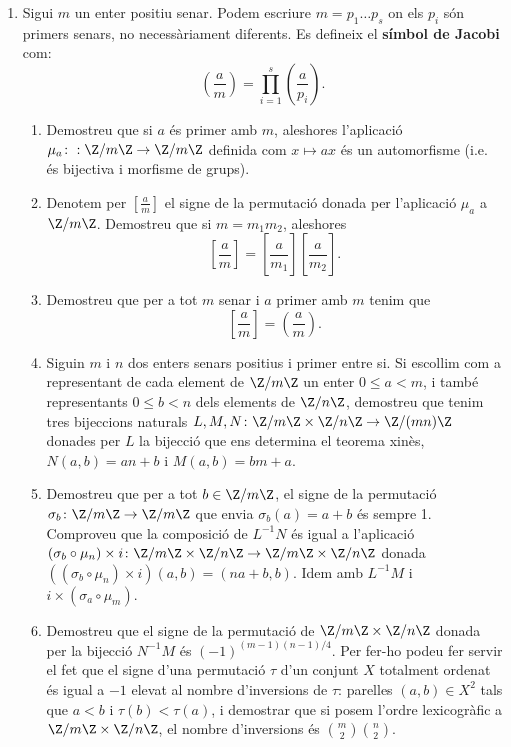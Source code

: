 \begin{enumerate}[leftmargin=*]
\item Sigui $m$ un enter positiu
senar. Podem escriure $m=p_1\dots p_s$ on els $p_i$ són primers
senars, no necessàriament diferents. Es defineix el \textbf{símbol de Jacobi}
com:
$$
\displaystyle{\left (\frac{a}{m} \right )=\prod_{i=1}^{s}\left
(\frac{a}{p_i} \right )}.
$$

\begin{enumerate}
\item Demostreu que si $a$ és primer amb $m$, aleshores
l'aplicació $\mu_a\colon : \Z/m\Z\to \Z/m\Z$ definida com $x\mapsto ax$ és un automorfisme
(i.e. és bijectiva i morfisme de grups).

\item Denotem per  $\displaystyle{\left[\frac{a}{m} \right]}$ el signe de la permutació donada per
l'aplicació $\mu_a$ a $\Z/m\Z$. Demostreu que si $m=m_1m_2$,
aleshores
$$
\displaystyle{\left[ \frac{a}{m} \right] =\left [\frac{a}{m_1}
\right]\left [\frac{a}{m_2} \right]}.
$$

\item Demostreu que per a tot $m$ senar i $a$ primer amb $m$
tenim que
$$\displaystyle{\left[\frac{a}{m} \right]}=\displaystyle{\left(\frac{a}{m}
\right)}.$$

\item Siguin $m$ i $n$ dos enters senars positius i primer
entre si. Si escollim com a representant de cada element de $\Z/m\Z$
un enter $0\le a <m$, i també representants $0\le b<n$ dels
elements de $\Z/n\Z$, demostreu que tenim tres bijeccions naturals
$L,M,N\colon \Z/m\Z\times \Z/n\Z\to \Z/(mn)\Z$ donades per $L$ la
bijecció que ens determina el teorema xin\`{e}s, $N(a,b)=an+b$ i
$M(a,b)=bm+a$.

\item Demostreu que per a tot $b\in \Z/m\Z$, el signe de la permutació
$\sigma_b\colon\Z/m\Z\to \Z/m\Z$ que envia $\sigma_b(a)=a+b$ és
sempre 1.  Comproveu que la composició de $L^{-1}N$ és igual
a l'aplicació $(\sigma_b\circ \mu_n)\times i \colon\Z/m\Z\times
\Z/n\Z\to \Z/m\Z\times \Z/n\Z$ donada $((\sigma_b\circ \mu_n)\times
i)(a,b)=(na+b,b)$. Idem amb $L^{-1}M$ i $i\times (\sigma_a\circ
\mu_m)$.

\item Demostreu que el signe de la permutació de $\Z/m\Z\times \Z/n\Z$ donada per la
bijecció $N^{-1}M$ és $(-1)^{(m-1)(n-1)/4}$. Per fer-ho podeu
fer servir el fet que el signe d'una permutació $\tau$ d'un conjunt $X$
totalment ordenat és igual a $-1$ elevat al nombre d'inversions de
$\tau$: parelles $(a,b)\in X^2$ tals que $a<b$ i $\tau(b)<\tau(a)$,
i demostrar que si posem l'ordre lexicogràfic a $\Z/m\Z\times
\Z/n\Z$, el nombre d'inversions és $ \binom{m}{2}\binom{n}{2}$.


\end{enumerate}
\end{enumerate}
